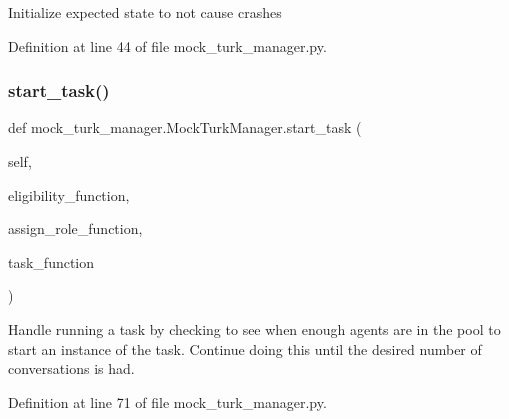 \begin{DoxyVerb}Initialize expected state to not cause crashes\end{DoxyVerb}
 

Definition at line 44 of file mock\+\_\+turk\+\_\+manager.\+py.

\mbox{\label{classmock__turk__manager_1_1MockTurkManager_aff5cae911d5177b4e8739ecac21ae3ac}} 
\subsubsection{\texorpdfstring{start\+\_\+task()}{start\_task()}}
{\footnotesize\ttfamily def mock\+\_\+turk\+\_\+manager.\+Mock\+Turk\+Manager.\+start\+\_\+task (\begin{DoxyParamCaption}\item[{}]{self,  }\item[{}]{eligibility\+\_\+function,  }\item[{}]{assign\+\_\+role\+\_\+function,  }\item[{}]{task\+\_\+function }\end{DoxyParamCaption})}

\begin{DoxyVerb}Handle running a task by checking to see when enough agents are
in the pool to start an instance of the task. Continue doing this
until the desired number of conversations is had.
\end{DoxyVerb}
 

Definition at line 71 of file mock\+\_\+turk\+\_\+manager.\+py.



